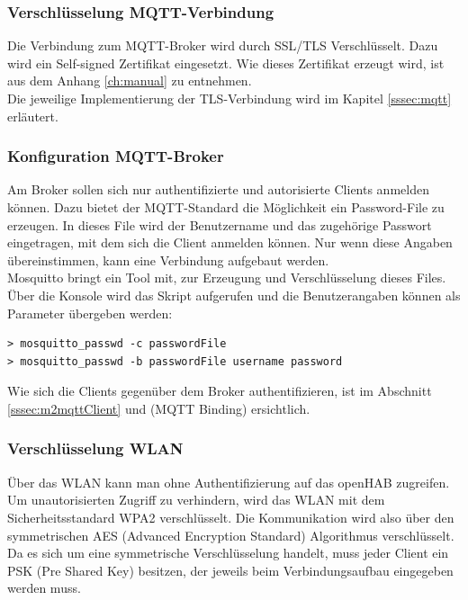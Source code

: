 \subsubsection{Verschlüsselung MQTT-Verbindung}
Die Verbindung zum MQTT-Broker wird durch SSL/TLS Verschlüsselt. Dazu wird ein Self-signed Zertifikat eingesetzt. Wie dieses Zertifikat erzeugt wird, ist aus dem Anhang \ref{ch:manual} zu entnehmen. \\
Die jeweilige Implementierung der TLS-Verbindung wird im Kapitel \ref{sssec:mqtt} erläutert.

\subsubsection{Konfiguration MQTT-Broker}
Am Broker sollen sich nur authentifizierte und autorisierte Clients anmelden können. Dazu bietet der MQTT-Standard die Möglichkeit ein Password-File zu erzeugen. In dieses File wird der Benutzername und das zugehörige Passwort eingetragen, mit dem sich die Client anmelden können. Nur wenn diese Angaben übereinstimmen, kann eine Verbindung aufgebaut werden. \\
Mosquitto bringt ein Tool mit, zur Erzeugung und Verschlüsselung dieses Files. Über die Konsole wird das Skript aufgerufen und die Benutzerangaben können als Parameter übergeben werden:
\begin{lstlisting}[style=csharp, caption=mosquitto\_passwd.exe - generate password-file]
> mosquitto_passwd -c passwordFile
> mosquitto_passwd -b passwordFile username password
\end{lstlisting}
Wie sich die Clients gegenüber dem Broker authentifizieren, ist im Abschnitt \ref{sssec:m2mqttClient} und \tbd (MQTT Binding) ersichtlich.

\subsubsection{Verschlüsselung WLAN}
Über das WLAN kann man ohne Authentifizierung auf das openHAB zugreifen. Um unautorisierten Zugriff zu verhindern, wird das WLAN mit dem Sicherheitsstandard WPA2 verschlüsselt. Die Kommunikation wird also über den symmetrischen AES (Advanced Encryption Standard) Algorithmus verschlüsselt. Da es sich um eine symmetrische Verschlüsselung handelt, muss jeder Client ein PSK (Pre Shared Key) besitzen, der jeweils beim Verbindungsaufbau eingegeben werden muss.





